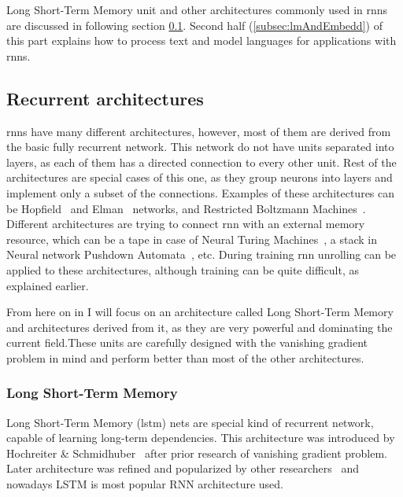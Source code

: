 Long Short-Term Memory unit and other architectures commonly used in \gls{rnn}s are discussed in following section \ref{subsec:recUnits}. Second half (\ref{subsec:lmAndEmbedd}) of this part explains how to process text and model languages for applications with \gls{rnn}s.

	\subsection{Recurrent architectures}\label{subsec:recUnits}

\gls{rnn}s have many different architectures, however, most of them are derived from the basic fully recurrent network. This network do not have units separated into layers, as each of them has a directed connection to every other unit. Rest of the architectures are special cases of this one, as they group neurons into layers and implement only a subset of the connections. Examples of these architectures can be Hopfield~\cite{hopfield1982neural} and Elman~\cite{elman1990finding} networks, and Restricted Boltzmann Machines~\cite{Smolensky:1986:IPD:104279.104290}. Different architectures are trying to connect \gls{rnn} with an external memory resource, which can be a tape in case of Neural Turing Machines~\cite{DBLP:journals/corr/GravesWD14}, a stack in Neural network Pushdown Automata~\cite{Sun:1997:NNP:647638.733213}, etc. During training \gls{rnn} unrolling can be applied to these architectures, although training can be quite difficult, as explained earlier.

From here on in I will focus on an architecture called Long Short-Term Memory and architectures derived from it, as they are very powerful and dominating the current field.These units are carefully designed with the vanishing gradient problem in mind and perform better than most of the other architectures.

		\subsubsection{Long Short-Term Memory}\label{subsubsec:lstm}
Long Short-Term Memory (\gls{lstm}) nets are special kind of recurrent network, capable of learning long-term dependencies. This architecture was introduced by Hochreiter \& Schmidhuber~\cite{Hochreiter:1997:LSM:1246443.1246450} after prior research of vanishing gradient problem. Later architecture was refined and popularized by other researchers~\cite{DBLP:conf/ijcnn/GersS00,DBLP:journals/neco/GersSC00} and nowadays LSTM is most popular RNN architecture used.

